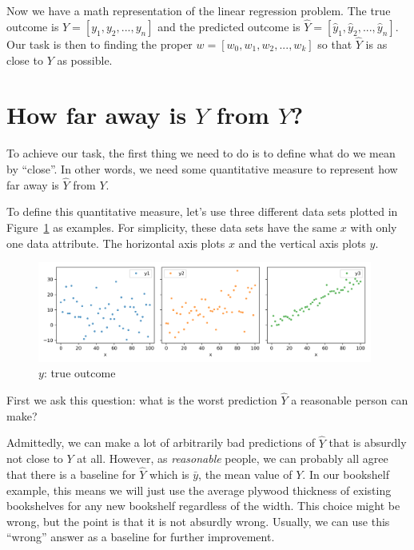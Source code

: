 \documentclass[
	letterpaper
]{article}
\begin{document}
Now we have a math representation of the linear regression problem.
The true outcome is $Y = [y_1, y_2, ..., y_n]$ and the predicted outcome is $\hat Y = [ \hat y_1, \hat y_2, ..., \hat y_n]$.
Our task is then to finding the proper $w = [w_0, w_1, w_2, ..., w_k]$ so that $\hat Y$ is as close to $Y$ as possible.

\section{How far away is $\hat Y$ from $Y$?}
To achieve our task, the first thing we need to do is to define what do we mean by ``close''.
In other words, we need some quantitative measure to represent how far away is $\hat Y$ from $Y$.

To define this quantitative measure, let's use three different data sets plotted in Figure~\ref{fig:raw-data} as examples.
For simplicity, these data sets have the same $x$ with only one data attribute.
The horizontal axis plots $x$ and the vertical axis plots $y$.
\begin{figure}[htbp]
	\centering
	\includegraphics[width=0.98\textwidth]{figures/comparison-raw-data.png}
	\caption{$y$: true outcome}
	\label{fig:raw-data}
\end{figure}

First we ask this question: what is the worst prediction $\hat Y$ a reasonable person can make?

Admittedly, we can make a lot of arbitrarily bad predictions of $\hat Y$ that is absurdly not close to $Y$ at all.
However, as \textit{reasonable} people,  we can probably all agree that there is a baseline for $\hat Y$ which is $\bar y$, the mean value of $Y$.
In our bookshelf example, this means we will just use the average plywood thickness of existing bookshelves for any new bookshelf regardless of the width.
This choice might be wrong, but the point is that it is not absurdly wrong.
Usually, we can use this ``wrong'' answer as a baseline for further improvement.
\end{document}
